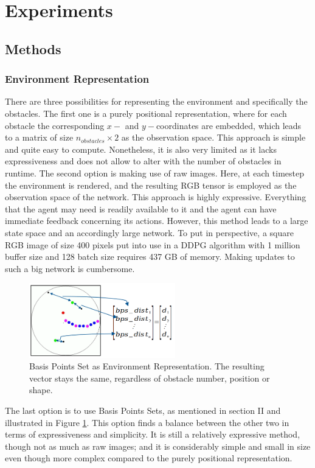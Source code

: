 \documentclass[conference]{IEEEtran}
\begin{document}
\section{Experiments}

\subsection{Methods}

\subsubsection{Environment Representation}

There are three possibilities for representing the environment and specifically the obstacles. The first one is a purely positional representation, where for each obstacle the corresponding $x-$ and $y-$coordinates are embedded, which leads to a matrix of size $n_{obstacles} \times 2$ as the observation space. This approach is simple and quite easy to compute. Nonetheless, it is also very limited as it lacks expressiveness and does not allow to alter with the number of obstacles in runtime. 
The second option is making use of raw images. Here, at each timestep the environment is rendered, and the resulting RGB tensor is employed as the observation space of the network. This approach is highly expressive. Everything that the agent may need is readily available to it and the agent can have immediate feedback concerning its actions. However, this method leads to a large state space and an accordingly large network. To put in perspective, a square RGB image of size 400 pixels put into use in a DDPG algorithm with 1 million buffer size and 128 batch size requires 437 GB of memory. Making updates to such a big network is cumbersome. 

\begin{figure}[!t]
	\centering
	\includegraphics[width=2.5in]{bpsill}
	\caption{Basis Points Set as Environment Representation. The resulting vector stays the same, regardless of obstacle number, position or shape.}
	\label{fig1}
\end{figure}

The last option is to use Basis Points Sets, as mentioned in section II and illustrated in Figure \ref{fig1}. This option finds a balance between the other two in terms of expressiveness and simplicity. It is still a relatively expressive method, though not as much as raw images; and it is considerably simple and small in size even though more complex compared to the purely positional representation.
\end{document}
